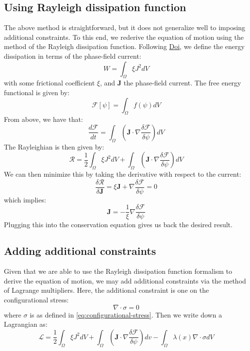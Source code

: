 \documentclass[reqno]{article}
\begin{document}
\subsection{Using Rayleigh dissipation function}
The above method is straightforward, but it does not generalize well to imposing additional constraints.
To this end, we rederive the equation of motion using the method of the Rayleigh dissipation function.
Following \href{https://iopscience.iop.org/article/10.1088/0953-8984/23/28/284118}{Doi}, we define the energy dissipation in terms of the phase-field current:
\begin{equation}
    W = \int_\Omega \xi J^2 dV
\end{equation}
with some frictional coefficient $\xi$, and $\mathbf{J}$ the phase-field current.
The free energy functional is given by:
\begin{equation}
    \mathcal{F}[\psi]
    =
    \int_\Omega f(\psi) dV
\end{equation}
From above, we have that:
\begin{equation}
    \frac{d \mathcal{F}}{dt}
    =
    \int_\Omega \left(\mathbf{J} \cdot \nabla \frac{\delta \mathcal{F}}{\delta \psi} \right)dV
\end{equation}
The Rayleighian is then given by:
\begin{equation}
    \mathcal{R}
    =
    \frac12 \int_\Omega \xi J^2 dV
    + \int_\Omega \left(\mathbf{J} \cdot \nabla \frac{\delta \mathcal{F}}{\delta \psi} \right)dV
\end{equation}
We can then minimize this by taking the derivative with respect to the current:
\begin{equation}
    \frac{\delta \mathcal{R}}{\delta \mathbf{J}}
    =
    \xi \mathbf{J}
    + \nabla \frac{\delta \mathcal{F}}{\delta \psi}
    =
    0   
\end{equation}
which implies:
\begin{equation}
    \mathbf{J}
    =
    -\frac{1}{\xi}
    \nabla \frac{\delta \mathcal{F}}{\delta \psi}
\end{equation}
Plugging this into the conservation equation gives us back the desired result.

\subsection{Adding additional constraints}
Given that we are able to use the Rayleigh dissipation function formalism to derive the equation of motion, we may add additional constraints via the method of Lagrange multipliers.
Here, the additional constraint is one on the configurational stress:
\begin{equation}
    \nabla \cdot \sigma = 0
\end{equation}
where $\sigma$ is as defined in \eqref{eq:configurational-stress}.
Then we write down a Lagrangian as:
\begin{equation}
    \mathcal{L}
    =
    \frac12 \int_\Omega \xi J^2 dV
    + 
    \int_\Omega \left( \mathbf{J} \cdot \nabla \frac{\delta \mathcal{F}}{\delta \psi} \right) dv
    -
    \int_\Omega \lambda(x) \nabla \cdot \sigma dV
\end{equation}
\end{document}
